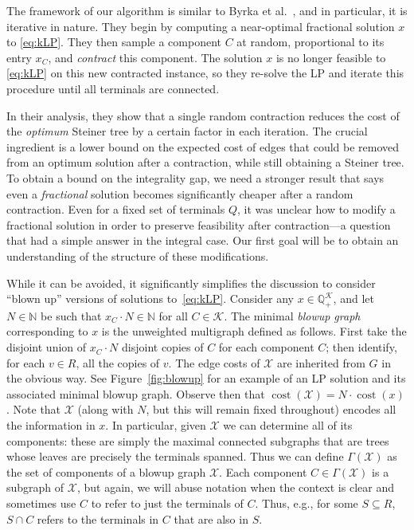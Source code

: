 \documentclass[11pt, letterpaper]{article}
\theoremstyle{definition}
\DeclareMathOperator{\cost}{cost}
\newcommand{\todo}[1]{}
\newcommand{\todo}[1]{{\color{blue}\emph{(#1)}}}
\newcommand{\grphx}{\mathcal{X}}
\newcommand{\compof}[1]{\Gamma(#1)}
\newcommand{\comp}{\mathcal{K}}
\newcommand{\compx}{\compof{\grphx}}
\begin{document}
\medskip

The framework of our algorithm is similar to Byrka et al.~\cite{byrka_2010_improved}, and in particular, it is iterative in nature.
They begin by computing a near-optimal fractional solution $x$ to \eqref{eq:kLP}. 
They then sample a component $C$ at random, proportional to its entry $x_C$, and \emph{contract} this component. 
The solution $x$ is no longer feasible to \eqref{eq:kLP} on this new contracted instance, so they re-solve the LP and iterate this procedure until all terminals are connected. 

In their analysis, they show that a single random contraction reduces the cost of the \emph{optimum} Steiner tree by a certain factor in each iteration.
The crucial ingredient is a lower bound on the expected cost of edges that could be removed from an optimum solution after a contraction, while still obtaining a Steiner tree.
To obtain a bound on the integrality gap, we need a stronger result that says even a 
\emph{fractional} solution becomes significantly cheaper after a random contraction.
Even for a fixed set of terminals $Q$, it was unclear how to modify a fractional solution 
in order to preserve feasibility after contraction---a question that had a simple answer in the integral case. \todo{should we say why?}
Our first goal will be to obtain an understanding of the structure of these modifications.




\medskip

While it can be avoided, it significantly simplifies the discussion to consider ``blown up'' versions of solutions to~\eqref{eq:kLP}.
Consider any $x \in \mathbb{Q}^{\comp}_+$, and let $N \in \mathbb{N}$ be such that $x_C \cdot N \in \mathbb{N}$ for all $C \in \comp$. 
The minimal \emph{blowup graph} corresponding to $x$ is the unweighted multigraph defined as follows.
First take the disjoint union of $x_C \cdot N$ disjoint copies of $C$ for each component $C$;
then identify, for each $v \in R$, all the copies of $v$.
The edge costs of $\grphx$ are inherited from $G$ in the obvious way.
See Figure~\ref{fig:blowup} for an example of an LP solution and its associated minimal blowup graph.
Observe then that $\cost(\grphx) = N\cdot\cost(x)$.
Note that $\grphx$ (along with $N$, but this will remain fixed throughout) encodes all the information in $x$. 
In particular, given $\grphx$ we can determine all of its components: these are simply the maximal connected subgraphs that are trees whose leaves are precisely the terminals spanned.
Thus we can define $\compx$ as the set of components of a blowup graph $\grphx$. 
Each component $C \in \compx$ is a subgraph of $\grphx$, but again, we will abuse notation when the context is clear and sometimes use $C$ to refer to just the terminals of $C$.
Thus, e.g., for some $S \subseteq R$, $S \cap C$ refers to the terminals in $C$ that are also in $S$.
\end{document}
